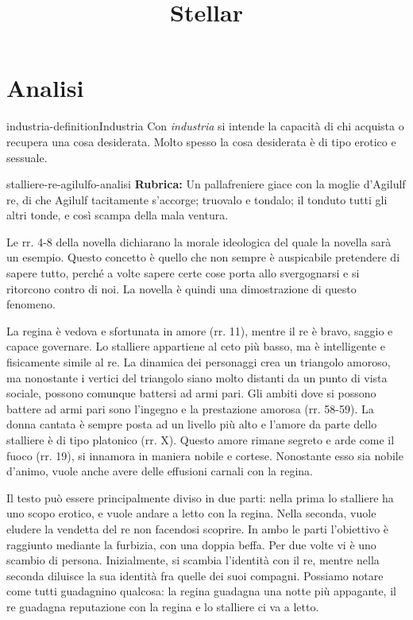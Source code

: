 \documentclass[preview]{standalone}
\begin{document}
\title{Stellar}
\genpage

\section{Analisi}

\begin{snippetdefinition}{industria-definition}{Industria}
    Con \textit{industria} si intende la capacità di chi acquista o recupera una cosa desiderata.
    Molto spesso la cosa desiderata è di tipo erotico e sessuale.
\end{snippetdefinition}

\begin{snippet}{stalliere-re-agilulfo-analisi}
    \textbf{Rubrica:} Un pallafreniere giace con la moglie d'Agilulf re, di che Agilulf tacitamente s'accorge; truovalo e tondalo; il tonduto tutti gli altri tonde, e così scampa della mala ventura.

    Le rr. 4-8 della novella dichiarano la morale ideologica del quale la novella sarà un esempio.
    Questo concetto è quello che non sempre è auspicabile pretendere di sapere tutto,
    perché a volte sapere certe cose porta allo svergognarsi e si ritorcono contro di noi.
    La novella è quindi una dimostrazione di questo fenomeno.
    
    La regina è vedova e sfortunata in amore (rr. 11),
    mentre il re è bravo, saggio e capace governare.
    Lo stalliere appartiene al ceto più basso, ma è intelligente e fisicamente simile al re.
    La dinamica dei personaggi crea un triangolo amoroso, ma nonostante
    i vertici del triangolo siano molto distanti da un punto di vista sociale, possono comunque battersi ad armi pari.
    Gli ambiti dove si possono battere ad armi pari sono l'ingegno e la prestazione amorosa (rr. 58-59).
    La donna cantata è sempre posta ad un livello più alto e l'amore da parte dello stalliere
    è di tipo platonico (rr. X).
    Questo amore rimane segreto e arde come il fuoco (rr. 19), si innamora in maniera nobile e
    cortese. Nonostante esso sia nobile d'animo, vuole anche avere delle effusioni carnali con la regina.
    
    Il testo può essere principalmente diviso in due parti: nella prima lo stalliere
    ha uno scopo erotico, e vuole andare a letto con la regina. Nella seconda,
    vuole eludere la vendetta del re non facendosi scoprire.
    In ambo le parti l'obiettivo è raggiunto mediante la furbizia, con una doppia beffa.
    Per due volte vi è uno scambio di persona. Inizialmente, si scambia l'identità con il re, mentre
    nella seconda diluisce la sua identità fra quelle dei suoi compagni.
    Possiamo notare come tutti guadagnino qualcosa: la regina guadagna una notte più appagante,
    il re guadagna reputazione con la regina e lo stalliere ci va a letto.
    

\end{snippet}
\end{document}
